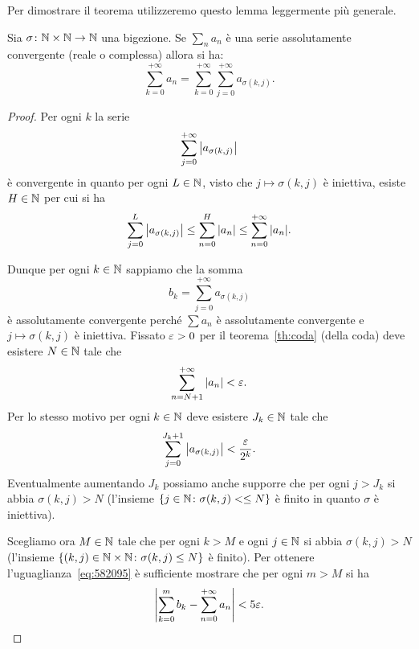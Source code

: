 Per dimostrare il teorema utilizzeremo questo
lemma leggermente più generale.

\begin{lemma}
Sia $\sigma\colon \mathbb N\times\mathbb N\to \mathbb N$ una bigezione.
Se $\displaystyle\sum_n a_n$ è una serie
assolutamente convergente  (reale o complessa) allora si ha:
\begin{equation}\label{eq:582095}
  \sum_{k=0}^{+\infty} a_n
  = \sum_{k=0}^{+\infty} \sum_{j=0}^{+\infty} a_{\sigma(k,j)}.
\end{equation}
\end{lemma}
%
%
\begin{proof}
Per ogni $k$ la serie
\[
  \sum_{j=0}^{+\infty} {\left|a_{\sigma(k,j)}\right|}
\]
è convergente in quanto per ogni $L\in \mathbb N$,
visto che $j \mapsto \sigma(k,j)$ è iniettiva,
esiste $H\in \mathbb N$ per cui si ha
\[
  \sum_{j=0}^L {\left|a_{\sigma(k,j)}\right|}
  \le \sum_{n=0}^{H} {\left|a_n\right|}
  \le \sum_{n=0}^{+\infty} {\left|a_n\right|}.
\]

Dunque per ogni $k\in\mathbb N$ sappiamo che la somma
\[
  b_k = \sum_{j=0}^{+\infty} a_{\sigma(k,j)}
\]
è assolutamente convergente perché $\sum a_n$ è assolutamente convergente
e $j\mapsto \sigma(k,j)$ è iniettiva.
Fissato $\varepsilon>0$ per il teorema~\ref{th:coda} (della coda)
deve esistere $N\in\mathbb N$ tale che
\[
  \sum_{n=N+1}^{+\infty} {\left|a_n\right|} < \varepsilon.
\]
Per lo stesso motivo
per ogni $k\in \mathbb N$ deve esistere $J_k\in \mathbb N$ tale che
\[
  \sum_{j=0}^{J_k+1} {\left|a_{\sigma(k,j)}\right|} < \frac{\varepsilon}{2^k}.
\]
Eventualmente aumentando $J_k$ possiamo anche supporre
che per ogni $j>J_k$ si abbia $\sigma(k,j)>N$
(l'insieme ${\left\{ j\in \mathbb N \colon \sigma(k,j)<\le N \right\}}$ è finito
in quanto $\sigma$ è iniettiva).

Scegliamo ora $M\in \mathbb N$ tale che
per ogni $k>M$ e ogni $j\in \mathbb N$ si abbia $\sigma(k,j)>N$
(l'insieme ${\left\{ (k,j)\in \mathbb N\times\mathbb N \colon \sigma(k,j)\le N \right\}}$
è finito).
Per ottenere l'uguaglianza~\eqref{eq:582095} è sufficiente
mostrare che per ogni $m>M$ si ha
\begin{equation}\label{eq:93655}
  {\left|\sum_{k=0}^m b_k - \sum_{n=0}^{+\infty} a_n\right|}
  < 5 \varepsilon.
\end{equation}


\end{proof}
